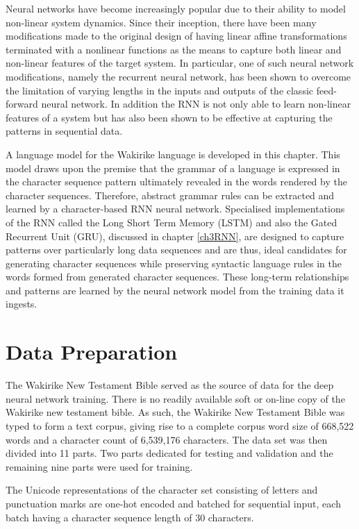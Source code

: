 Neural networks have become increasingly popular due to their ability to model non-linear system dynamics. Since their inception, there have been many modifications made to the original design of having linear affine transformations terminated with a nonlinear functions as the means to capture both linear and non-linear features of the target system. In particular, one of such neural network  modifications, namely the recurrent neural network, has been shown to overcome the limitation of varying lengths in the inputs and outputs of the classic feed-forward neural network.  In addition the RNN is not only able to learn non-linear features of a system but has also been shown to be effective at capturing the patterns in sequential data.

A language model for the Wakirike language is developed in this chapter.  This model draws upon the premise that the grammar of a language is expressed in the character sequence pattern ultimately revealed in the words rendered by the character sequences.  Therefore, abstract grammar rules can be extracted and learned by a character-based RNN neural network.  Specialised implementations of the RNN called the Long Short Term Memory (LSTM) and also the Gated Recurrent Unit (GRU), discussed in chapter \ref{ch3RNN}, are designed to capture patterns over particularly long data sequences and are thus, ideal candidates for generating character sequences while preserving syntactic language rules in the words formed from generated character sequences.  These long-term relationships and patterns are learned by the neural network model from the training data it ingests.

\section{Data Preparation}
The Wakirike New Testament Bible served as the source of data for the deep neural network training.  There is no readily available soft or on-line copy of the Wakirike new testament bible. As such, the Wakirike New Testament Bible was typed to form a text corpus, giving rise to a complete corpus word size of 668,522 words and a character count of 6,539,176 characters.  The data set was then divided into 11 parts. Two parts dedicated for testing and validation and the remaining nine parts were used for training.

The Unicode representations of the character set consisting of letters and punctuation marks are one-hot encoded and batched for sequential input, each batch having a character sequence length of 30 characters.


